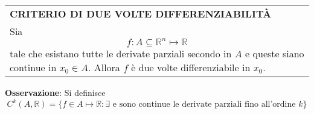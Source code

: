 \documentclass[a4paper]{extarticle}
\renewcommand\arraystretch{}
\begin{document}
\vspace{1em}
\setlength{\tabcolsep}{14pt}
\renewcommand{\arraystretch}{2}
\noindent
\begin{tabularx}{\textwidth}{@{}|P|@{}}
    \hline
    {\textbf{CRITERIO DI DUE VOLTE DIFFERENZIABILITÀ}}\\
    \parbox{\linewidth}{Sia
    \[f : A \subseteq \mathbb{R}^n \longmapsto \mathbb{R}\]    
    tale che esistano tutte le derivate parziali secondo in $A$ e queste siano continue in $x_0 \in A$. Allora $f$ è due volte differenziabile in $x_0$.\vspace{3mm}}\\
    \hline
\end{tabularx}

\vspace{1em}
\noindent
\textbf{Osservazione}: Si definisce
\[C^k(A,\mathbb{R}) = \{f \in A \longmapsto \mathbb{R} : \exists \text{ e sono continue le derivate parziali fino all'ordine } k\}\]
\end{document}
